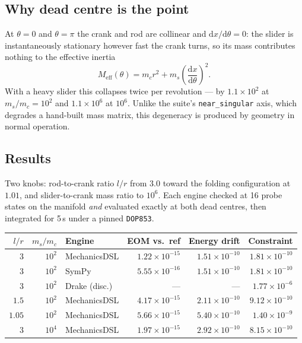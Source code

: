 \documentclass[11pt,a4paper]{article}
\begin{document}
\subsection{Why dead centre is the point}

At $\theta = 0$ and $\theta = \pi$ the crank and rod are collinear and
$\mathrm{d}x/\mathrm{d}\theta = 0$: the slider is instantaneously stationary
however fast the crank turns, so its mass contributes nothing to the effective
inertia
\begin{equation}
M_{\text{eff}}(\theta) = m_c r^2 + m_s\left(\frac{\mathrm{d}x}{\mathrm{d}\theta}\right)^2 .
\end{equation}
With a heavy slider this collapses twice per revolution --- by $1.1\times10^{2}$
at $m_s/m_c = 10^2$ and $1.1\times10^{6}$ at $10^6$. Unlike the suite's
\texttt{near\_singular} axis, which degrades a hand-built mass matrix, this
degeneracy is produced by geometry in normal operation.

\subsection{Results}

Two knobs: rod-to-crank ratio $l/r$ from $3.0$ toward the folding configuration
at $1.01$, and slider-to-crank mass ratio to $10^6$. Each engine checked at 16
probe states on the manifold \emph{and} evaluated exactly at both dead centres,
then integrated for 5\,s under a pinned \texttt{DOP853}.

\begin{center}
\begin{tabular}{@{}rrlrrr@{}}
\toprule
$l/r$ & $m_s/m_c$ & \textbf{Engine} & \textbf{EOM vs.\ ref} & \textbf{Energy drift} & \textbf{Constraint} \\
\midrule
$3$    & $10^2$ & MechanicsDSL & $1.22\times10^{-15}$ & $1.51\times10^{-10}$ & $1.81\times10^{-10}$ \\
$3$    & $10^2$ & SymPy        & $5.55\times10^{-16}$ & $1.51\times10^{-10}$ & $1.81\times10^{-10}$ \\
$3$    & $10^2$ & Drake (disc.) & ---                 & ---                  & $1.77\times10^{-6}$ \\
$1.5$  & $10^2$ & MechanicsDSL & $4.17\times10^{-15}$ & $2.11\times10^{-10}$ & $9.12\times10^{-10}$ \\
$1.05$ & $10^2$ & MechanicsDSL & $5.66\times10^{-15}$ & $5.40\times10^{-10}$ & $1.40\times10^{-9}$ \\
$3$    & $10^4$ & MechanicsDSL & $1.97\times10^{-15}$ & $2.92\times10^{-10}$ & $8.15\times10^{-10}$ \\
\bottomrule
\end{tabular}
\end{center}
\end{document}
